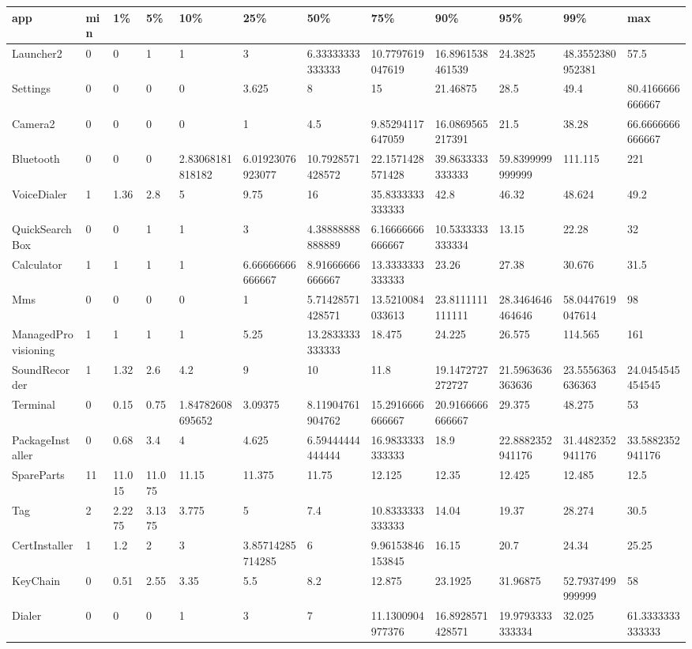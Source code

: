 \begin{tabular}{|l|l|l|l|l|l|l|l|l|l|l|l|}
\hline
app&min&1\%&5\%&10\%&25\%&50\%&75\%&90\%&95\%&99\%&max\\
\hline
Launcher2&0&0&1&1&3&6.33333333333333&10.7797619047619&16.8961538461539&24.3825&48.3552380952381&57.5\\
\hline
Settings&0&0&0&0&3.625&8&15&21.46875&28.5&49.4&80.4166666666667\\
\hline
Camera2&0&0&0&0&1&4.5&9.85294117647059&16.0869565217391&21.5&38.28&66.6666666666667\\
\hline
Bluetooth&0&0&0&2.83068181818182&6.01923076923077&10.7928571428572&22.1571428571428&39.8633333333333&59.8399999999999&111.115&221\\
\hline
VoiceDialer&1&1.36&2.8&5&9.75&16&35.8333333333333&42.8&46.32&48.624&49.2\\
\hline
QuickSearchBox&0&0&1&1&3&4.38888888888889&6.16666666666667&10.5333333333334&13.15&22.28&32\\
\hline
Calculator&1&1&1&1&6.66666666666667&8.91666666666667&13.3333333333333&23.26&27.38&30.676&31.5\\
\hline
Mms&0&0&0&0&1&5.71428571428571&13.5210084033613&23.8111111111111&28.3464646464646&58.0447619047614&98\\
\hline
ManagedProvisioning&1&1&1&1&5.25&13.2833333333333&18.475&24.225&26.575&114.565&161\\
\hline
SoundRecorder&1&1.32&2.6&4.2&9&10&11.8&19.1472727272727&21.5963636363636&23.5556363636363&24.0454545454545\\
\hline
Terminal&0&0.15&0.75&1.84782608695652&3.09375&8.11904761904762&15.2916666666667&20.9166666666667&29.375&48.275&53\\
\hline
PackageInstaller&0&0.68&3.4&4&4.625&6.59444444444444&16.9833333333333&18.9&22.8882352941176&31.4482352941176&33.5882352941176\\
\hline
SpareParts&11&11.015&11.075&11.15&11.375&11.75&12.125&12.35&12.425&12.485&12.5\\
\hline
Tag&2&2.2275&3.1375&3.775&5&7.4&10.8333333333333&14.04&19.37&28.274&30.5\\
\hline
CertInstaller&1&1.2&2&3&3.85714285714285&6&9.96153846153845&16.15&20.7&24.34&25.25\\
\hline
KeyChain&0&0.51&2.55&3.35&5.5&8.2&12.875&23.1925&31.96875&52.7937499999999&58\\
\hline
Dialer&0&0&0&1&3&7&11.1300904977376&16.8928571428571&19.9793333333334&32.025&61.3333333333333\\
\hline

\end{tabular}
